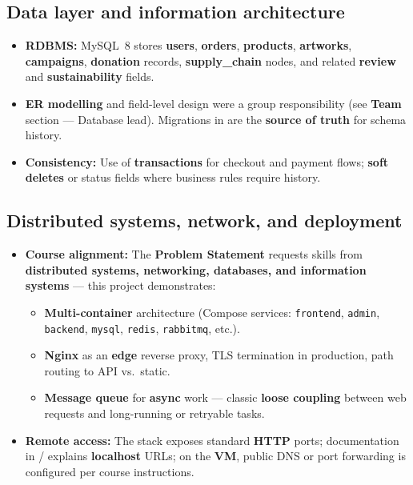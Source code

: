 \documentclass[11pt,a4paper]{article}
\begin{document}
\subsection{Data layer and information architecture}
\begin{itemize}
  \item \textbf{RDBMS:} MySQL~8 stores \textbf{users}, \textbf{orders}, \textbf{products}, \textbf{artworks}, \textbf{campaigns}, \textbf{donation} records, \textbf{supply\_chain} nodes, and related \textbf{review} and \textbf{sustainability} fields.
  \item \textbf{ER modelling} and field-level design were a group responsibility (see \textbf{Team} section --- Database lead). Migrations in  are the \textbf{source of truth} for schema history.
  \item \textbf{Consistency:} Use of \textbf{transactions} for checkout and payment flows; \textbf{soft deletes} or status fields where business rules require history.
\end{itemize}

\subsection{Distributed systems, network, and deployment}
\begin{itemize}
  \item \textbf{Course alignment:} The \textbf{Problem Statement} requests skills from \textbf{distributed systems, networking, databases, and information systems} --- this project demonstrates:
  \begin{itemize}
    \item \textbf{Multi-container} architecture (Compose services: \texttt{frontend}, \texttt{admin}, \texttt{backend}, \texttt{mysql}, \texttt{redis}, \texttt{rabbitmq}, etc.).
    \item \textbf{Nginx} as an \textbf{edge} reverse proxy, TLS termination in production, path routing to API vs.\ static.
    \item \textbf{Message queue} for \textbf{async} work --- classic \textbf{loose coupling} between web requests and long-running or retryable tasks.
  \end{itemize}
  \item \textbf{Remote access:} The stack exposes standard \textbf{HTTP} ports; documentation in  /  explains \textbf{localhost} URLs; on the \textbf{VM}, public DNS or port forwarding is configured per course instructions.
\end{itemize}
\end{document}

